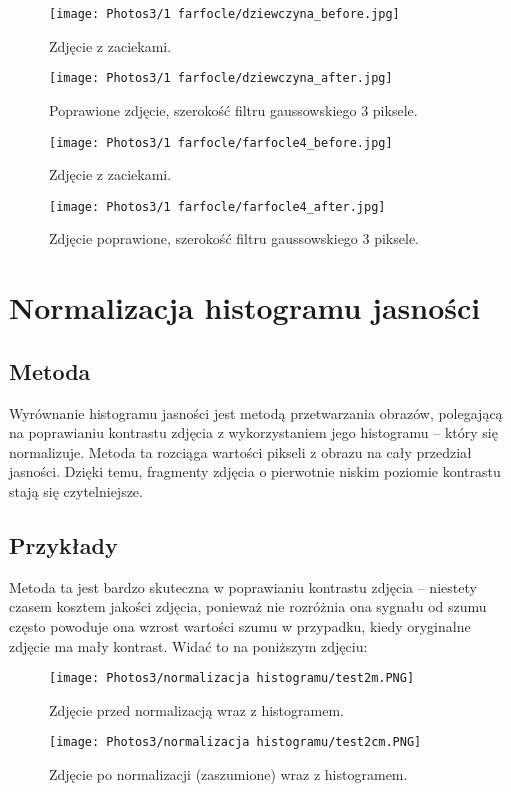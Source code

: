 \documentclass[]{mwart}
\begin{document}
\begin{figure}[H]
    \centering
    \texttt{[image: Photos3/1 farfocle/dziewczyna\_before.jpg]}
    \caption{Zdjęcie z zaciekami.}
\end{figure}
\begin{figure}[H]
    \centering
    \texttt{[image: Photos3/1 farfocle/dziewczyna\_after.jpg]}
    \caption{Poprawione zdjęcie, szerokość filtru gaussowskiego $3$ piksele.}
\end{figure}

\begin{figure}[H]
    \centering
    \texttt{[image: Photos3/1 farfocle/farfocle4\_before.jpg]}
    \caption{Zdjęcie z zaciekami.}
\end{figure}
\begin{figure}[H]
    \centering
    \texttt{[image: Photos3/1 farfocle/farfocle4\_after.jpg]}
    \caption{Zdjęcie poprawione, szerokość filtru gaussowskiego $3$ piksele.}
\end{figure}




\newpage

\section{Normalizacja histogramu jasności       }
\subsection{Metoda}
Wyrównanie histogramu jasności jest metodą przetwarzania obrazów, polegającą na
poprawianiu kontrastu zdjęcia z wykorzystaniem jego histogramu -- który się normalizuje.
Metoda ta rozciąga wartości pikseli z obrazu na cały przedział jasności.
Dzięki temu, fragmenty zdjęcia o pierwotnie niskim poziomie kontrastu stają się czytelniejsze.


\subsection{Przykłady}
Metoda ta jest bardzo skuteczna w poprawianiu kontrastu zdjęcia -- niestety czasem
kosztem jakości zdjęcia, ponieważ nie rozróżnia ona sygnału od szumu często powoduje ona wzrost wartości szumu w przypadku, kiedy
oryginalne zdjęcie ma mały kontrast. Widać to na poniższym zdjęciu:


\begin{figure}[H]
    \centering
    \texttt{[image: Photos3/normalizacja histogramu/test2m.PNG]}
    \caption{Zdjęcie przed normalizacją wraz z histogramem.}
\end{figure}
\begin{figure}[H]
    \centering
    \texttt{[image: Photos3/normalizacja histogramu/test2cm.PNG]}
    \caption{Zdjęcie po normalizacji (zaszumione) wraz z histogramem.}
\end{figure}
\end{document}
